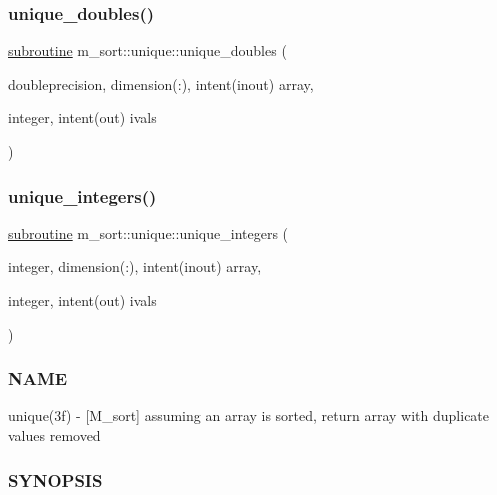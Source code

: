 \mbox{\label{interfacem__sort_1_1unique_a054c4941cf5925504732c715e5548f5b}} 
\subsubsection{\texorpdfstring{unique\+\_\+doubles()}{unique\_doubles()}}
{\footnotesize\ttfamily \hyperlink{M__stopwatch_83_8txt_acfbcff50169d691ff02d4a123ed70482}{subroutine} m\+\_\+sort\+::unique\+::unique\+\_\+doubles (\begin{DoxyParamCaption}\item[{doubleprecision, dimension(\+:), intent(inout)}]{array,  }\item[{integer, intent(out)}]{ivals }\end{DoxyParamCaption})\hspace{0.3cm}{\ttfamily [private]}}

\mbox{\label{interfacem__sort_1_1unique_a3e0d108450dfad8debcc3a8ab9e75c6d}} 
\subsubsection{\texorpdfstring{unique\+\_\+integers()}{unique\_integers()}}
{\footnotesize\ttfamily \hyperlink{M__stopwatch_83_8txt_acfbcff50169d691ff02d4a123ed70482}{subroutine} m\+\_\+sort\+::unique\+::unique\+\_\+integers (\begin{DoxyParamCaption}\item[{integer, dimension(\+:), intent(inout)}]{array,  }\item[{integer, intent(out)}]{ivals }\end{DoxyParamCaption})\hspace{0.3cm}{\ttfamily [private]}}



\subsubsection*{N\+A\+ME}

unique(3f) -\/ \mbox{[}M\+\_\+sort\mbox{]} assuming an array is sorted, return array with duplicate values removed \subsubsection*{S\+Y\+N\+O\+P\+S\+IS}

